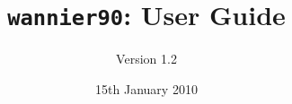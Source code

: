 \documentclass[a4paper,11pt,twoside]{book}
\title{{\tt wannier90}: User Guide}
\author{Version 1.2}
\date{15th January 2010}
\begin{document}
\newcommand{\wannier}{\texttt{wannier90}}
\newcommand{\pwscf}{\textsc{pwscf}}
\newcommand{\QE}{\textsc{quantum-espresso}}
\newcommand{\Mkb}{\mathbf{M}^{(\mathbf{k},\mathbf{b})}}
\newcommand{\Ak}{\mathbf{A}^{(\mathbf{k})}}
\newcommand{\Uk}{\mathbf{U}^{(\mathbf{k})}}
\newcommand{\cond}{\item[$\star$]}
\newcommand{\omi}{\Omega_{\mathrm{I}}}
\newcommand{\omt}{\widetilde{\Omega}}


\maketitle
























%
\end{document}

